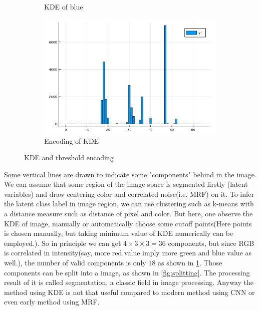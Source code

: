 \documentclass{article}
\begin{document}
\begin{figure}[htb]
\begin{subfigure}[b]{0.24\linewidth}
    \caption{KDE of blue}
  \end{subfigure}
  \begin{subfigure}[b]{0.24\linewidth}
    \includegraphics[width=\linewidth]{images/kde_code.png}
    \caption{Encoding of KDE}
  \end{subfigure}
  \caption{KDE and threshold encoding}
  \label{fig:kde}
\end{figure}

Some vertical lines are drawn to indicate some "components" behind in the image. 
We can assume that some region of the image space is segmented firstly (latent variables) 
and draw centering color and correlated noise(i.e. MRF) on it. 
To infer the latent class label in image region,
we can use clustering such as k-means with a distance measure such as distance of pixel and color. 
But here, one observe the KDE of image,
manually or automatically choose some cutoff points(Here points is chosen manually, 
but taking minimum value of KDE numerically can be employed.). 
So in principle we can get $4\times 3\times 3=36$ components, 
but since RGB is correlated in intensity(say, more red value imply more green and blue value as well.), 
the number of valid components is only $18$ as shown in \ref{fig:kde}.
Those components can be split into a image, as shown in \ref{fig:splitting}. 
The processing result of it is called segmentation, a classic field in image processing. 
Anyway the method using KDE is not that useful compared to modern method using CNN \cite{long2015fully} or 
even early method using MRF\cite{panjwani1995markov}. 
\end{document}
